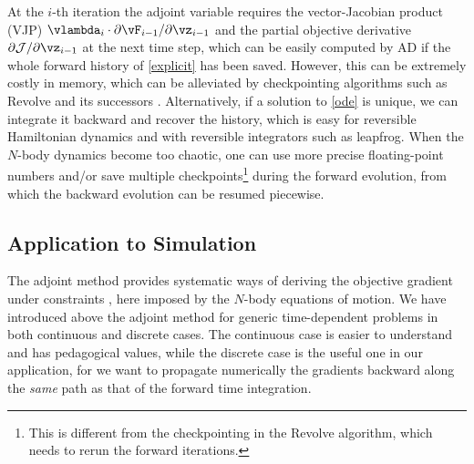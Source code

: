 \documentclass[modern, dvipsnames]{aastex631}
\newcommand{\p}{\partial}
\newcommand{\cJ}{\mathcal{J}}
\begin{document}
At the $i$-th iteration the adjoint variable requires the
vector-Jacobian product (VJP) $\vlambda_i \cdot \p\vF_{i-1} /
\p\vz_{i-1}$ and the partial objective derivative $\p\cJ / \p\vz_{i-1}$
at the next time step, which can be easily computed by AD if the whole
forward history of \eqref{explicit} has been saved.
However, this can be extremely costly in memory, which can be alleviated
by checkpointing algorithms such as Revolve and its successors
\citep{Revolve}.
Alternatively, if a solution to \eqref{ode} is unique, we can integrate
it backward and recover the history, which is easy for reversible
Hamiltonian dynamics and with reversible integrators such as leapfrog.
When the $N$-body dynamics become too chaotic, one can use more precise
floating-point numbers and/or save multiple checkpoints\footnote{This is
different from the checkpointing in the Revolve algorithm, which needs
to rerun the forward iterations.} during the forward evolution, from
which the backward evolution can be resumed piecewise.


\vspace{1em}
\subsection{Application to Simulation}
\label{sec:adj}

The adjoint method provides systematic ways of deriving the objective
gradient under constraints \citep{Pontryagin1962}, here imposed by the
$N$-body equations of motion.
We have introduced above the adjoint method for generic time-dependent
problems in both continuous and discrete cases.
The continuous case is easier to understand and has pedagogical values,
while the discrete case is the useful one in our application, for we
want to propagate numerically the gradients backward along the
\emph{same} path as that of the forward time integration.
\end{document}

